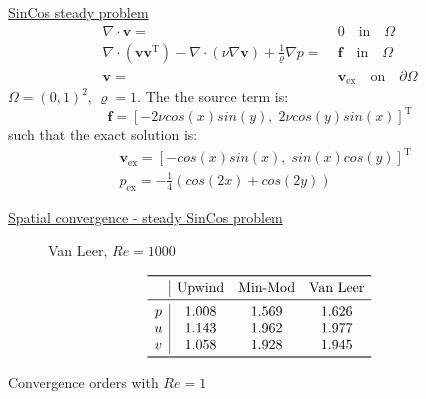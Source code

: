 \documentclass{beamer}
\begin{document}
\begin{frame}[label=spaceconvSupp]{\hyperlink{spaceconv}{SinCos steady problem}}
\begin{align*}
\nabla \cdot \mathbf{v} =& \; 0 \quad \text{in} \quad \Omega\\
\nabla \cdot (\mathbf{v} \mathbf{v^\mathrm{T}}) - \nabla \cdot (\nu 
\nabla \mathbf{v}) + \frac{1}{\varrho}\nabla p =& \; \mathbf{f} \quad \text{in} 
\quad \Omega\\
\mathbf{v} =& \; \mathbf{v}_\text{ex} \quad \text{on} \quad \partial \Omega
\end{align*}
$\Omega = (0,1)^2$, $\varrho = 1$. The the source term is:
\begin{equation*}
\mathbf{f} = [-2 \nu cos(x) sin(y), \; 2 \nu cos(y) sin(x)]^\mathrm{T}
\end{equation*}
such that the exact solution is:
\begin{align*}
&\mathbf{v}_\text{ex} = [-cos(x) sin(x), \; sin(x) cos(y)]^\mathrm{T}\\
&p_\text{ex} = -\frac{1}{4} (cos(2x)+cos(2y))
\end{align*}
\end{frame}
\begin{frame}{\hyperlink{spaceconv}{Spatial convergence - steady SinCos 
problem}}
\begin{figure}
	\centering
	
	\caption{\tiny Van Leer, $Re=1000$}
\end{figure}
\vspace{-0.3cm}
\begin{table}\footnotesize
	\[
	\begin{array}{c|ccc}
	\toprule
	& \text{Upwind} & \text{Min-Mod} & \text{Van Leer} \\ 
	\midrule
	p & 1.008 & 1.569 & 1.626\\
	u & 1.143 & 1.962 & 1.977\\
	v & 1.058 & 1.928 & 1.945\\
	\bottomrule
	\end{array}
	\]
	\caption{\tiny Convergence orders with $Re = 1$}
\end{table}
\end{frame}
\end{document}
